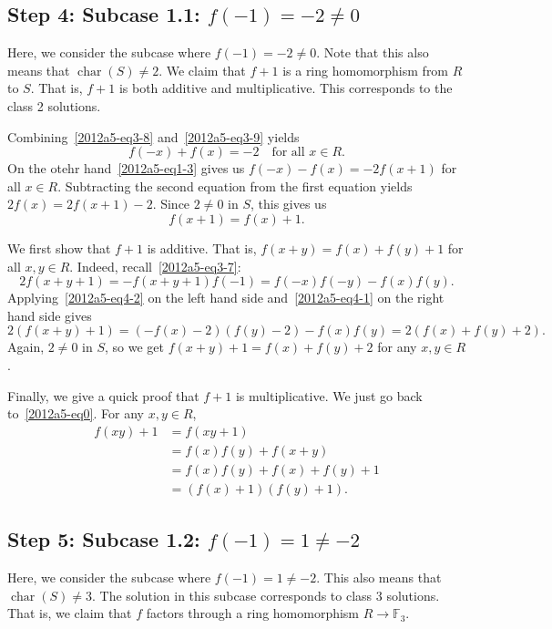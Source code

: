 \documentclass{article}
\newcommand{\F}{\mathbb{F}}
\DeclareMathOperator{\rchar}{char}
\begin{document}
\subsection*{Step 4: Subcase 1.1: $f(-1) = -2 \neq 0$}

Here, we consider the subcase where $f(-1) = -2 \neq 0$.
Note that this also means that $\rchar(S) \neq 2$.
We claim that $f + 1$ is a ring homomorphism from $R$ to $S$.
That is, $f + 1$ is both additive and multiplicative.
This corresponds to the class 2 solutions.

Combining~\eqref{2012a5-eq3-8} and~\eqref{2012a5-eq3-9} yields
\[ f(-x) + f(x) = -2 \quad \text{for all } x \in R. \tag{4.1}\label{2012a5-eq4-1} \]
On the otehr hand~\eqref{2012a5-eq1-3} gives us $f(-x) - f(x) = -2 f(x + 1)$ for all $x \in R$.
Subtracting the second equation from the first equation yields $2 f(x) = 2 f(x + 1) - 2$.
Since $2 \neq 0$ in $S$, this gives us
\[ f(x + 1) = f(x) + 1. \tag{4.2}\label{2012a5-eq4-2} \]

We first show that $f + 1$ is additive.
That is, $f(x + y) = f(x) + f(y) + 1$ for all $x, y \in R$.
Indeed, recall~\eqref{2012a5-eq3-7}:
\[ 2 f(x + y + 1) = -f(x + y + 1) f(-1) = f(-x) f(-y) - f(x) f(y). \]
Applying~\eqref{2012a5-eq4-2} on the left hand side and~\eqref{2012a5-eq4-1} on the right hand side gives
\[ 2 (f(x + y) + 1) = (-f(x) - 2)(f(y) - 2) - f(x) f(y) = 2 (f(x) + f(y) + 2). \]
Again, $2 \neq 0$ in $S$, so we get $f(x + y) + 1 = f(x) + f(y) + 2$ for any $x, y \in R$.

Finally, we give a quick proof that $f + 1$ is multiplicative.
We just go back to~\eqref{2012a5-eq0}.
For any $x, y \in R$,
\begin{align*}
    f(xy) + 1
    &= f(xy + 1) \\
    &= f(x) f(y) + f(x + y) \\
    &= f(x) f(y) + f(x) + f(y) + 1 \\
    &= (f(x) + 1)(f(y) + 1).
\end{align*}









\subsection*{Step 5: Subcase 1.2: $f(-1) = 1 \neq -2$}

Here, we consider the subcase where $f(-1) = 1 \neq -2$.
This also means that $\rchar(S) \neq 3$.
The solution in this subcase corresponds to class 3 solutions.
That is, we claim that $f$ factors through a ring homomorphism $R \to \F_3$.
\end{document}
